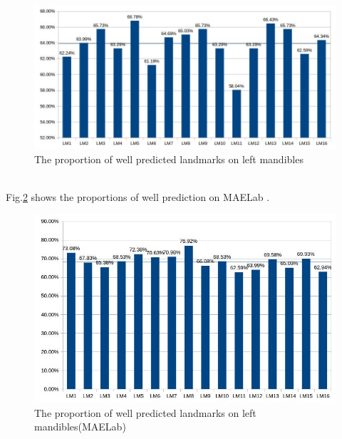 \documentclass[12pt,a4paper]{article}
\begin{document}
\begin{figure}[h!]
	\centering
	\includegraphics[scale=0.55]{images/mg}
	\caption{The proportion of well predicted landmarks on left mandibles}
	\label{mgfig}
\end{figure}~\\
Fig.\ref{mgfig2} shows the proportions of well prediction on MAELab \cite{le:hal-01571440}.
\begin{figure}[h!]
	\centering
	\includegraphics[scale=0.53]{images/mgSIFT}
	\caption{The proportion of well predicted landmarks on left mandibles(MAELab)}
	\label{mgfig2}
\end{figure}~\\
\end{document}
